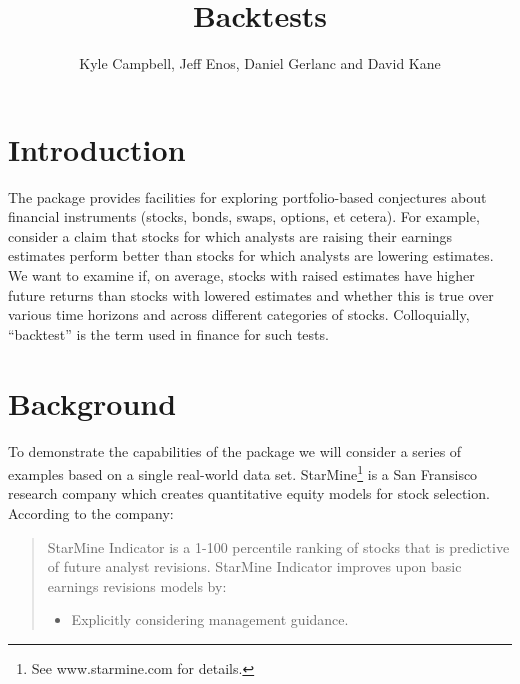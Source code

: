 \documentclass[a4paper]{report}
\begin{document}

\begin{article}
\title{Backtests}
\author{Kyle Campbell, Jeff Enos, Daniel Gerlanc and David Kane}



\maketitle


\section*{Introduction}

The  package provides facilities for exploring
portfolio-based conjectures about financial instruments (stocks, bonds,
swaps, options, et cetera).  For example, consider a claim that stocks
for which analysts are raising their earnings estimates perform better
than stocks for which analysts are lowering estimates.  We want to
examine if, on average, stocks with raised estimates have higher
future returns than stocks with lowered estimates and whether this is
true over various time horizons and across different categories of
stocks.  Colloquially, ``backtest'' is the term used in finance for
such tests.

\section*{Background}
To demonstrate the capabilities of the  package we will
consider a series of examples based on a single real-world data set.
StarMine\footnote{See www.starmine.com for details.} is a San
Fransisco research company which creates quantitative equity models
for stock selection.  According to the company:


\small

\begin{quote}
  StarMine Indicator is a 1-100 percentile ranking of stocks that is
  predictive of future analyst revisions. StarMine Indicator improves
  upon basic earnings revisions models by:

\begin{itemize}
\item Explicitly considering management guidance.
  

\end{itemize}
\end{quote}
\end{article}
\end{document}
